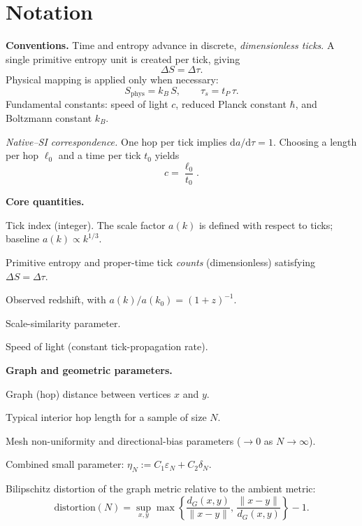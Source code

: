 \section*{Notation}

\noindent\textbf{Conventions.}  
Time and entropy advance in discrete, \emph{dimensionless ticks}.  
A single primitive entropy unit is created per tick, giving
\[
  \Delta S = \Delta \tau.
\]
Physical mapping is applied only when necessary:
\[
  S_{\mathrm{phys}} = k_B\,S, \qquad
  \tau_s = t_P\,\tau.
\]
Fundamental constants: speed of light \(c\), reduced Planck constant \(\hbar\), and Boltzmann constant \(k_B\).

\smallskip
\noindent\textit{Native--SI correspondence.}  
One hop per tick implies \(\mathrm{d}a/\mathrm{d}\tau = 1\).  
Choosing a length per hop \(\ell_0\) and a time per tick \(t_0\) yields
\[
  c = \frac{\ell_0}{t_0}.
\]

\bigskip
\noindent\textbf{Core quantities.}
\begin{description}[leftmargin=2.4em,labelsep=0.8em]
  \item[\(k\)] Tick index (integer). The scale factor \(a(k)\) is defined with respect to ticks; baseline \(a(k)\propto k^{1/3}\).
  \item[\(\Delta S,\,\Delta\tau\)] Primitive entropy and proper-time tick \emph{counts} (dimensionless) satisfying \(\Delta S=\Delta\tau\).
  \item[\(z\)] Observed redshift, with \(a(k)/a(k_0) = (1+z)^{-1}\).
  \item[\(\Lambda\)] Scale-similarity parameter.
  \item[\(c\)] Speed of light (constant tick-propagation rate).
\end{description}

\noindent\textbf{Graph and geometric parameters.}
\begin{description}[leftmargin=2.4em,labelsep=0.8em]
  \item[\(d_G(x,y)\)] Graph (hop) distance between vertices \(x\) and \(y\).
  \item[\(\ell_N\)] Typical interior hop length for a sample of size \(N\).
  \item[\(\varepsilon_N,\,\delta_N\)] Mesh non-uniformity and directional-bias parameters (\(\to 0\) as \(N\to\infty\)).
  \item[\(\eta_N\)] Combined small parameter: \(\eta_N := C_1\varepsilon_N + C_2\delta_N.\)
  \item[\(\mathrm{distortion}(N)\)] Bilipschitz distortion of the graph metric relative to the ambient metric:
  \[
    \mathrm{distortion}(N)
      = \sup_{x,y}
        \max\!\left\{
          \frac{d_G(x,y)}{\|x-y\|},\,
          \frac{\|x-y\|}{d_G(x,y)}
        \right\}-1.
  \]
\end{description}

